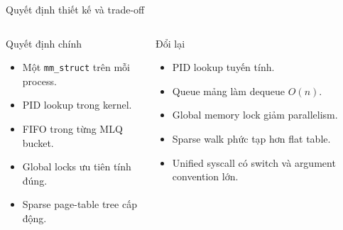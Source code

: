\documentclass[aspectratio=169,11pt]{beamer}
\newcommand{\code}[1]{\texttt{\color{bkblue}#1}}
\begin{document}
\begin{frame}{Quyết định thiết kế và trade-off}
  \begin{columns}[T,onlytextwidth]
      \begin{block}{Quyết định chính}
        \small
        \begin{itemize}
          \item Một \code{mm\_struct} trên mỗi process.
          \item PID lookup trong kernel.
          \item FIFO trong từng MLQ bucket.
          \item Global locks ưu tiên tính đúng.
          \item Sparse page-table tree cấp động.
        \end{itemize}
      \end{block}
      \begin{block}{Đổi lại}
        \small
        \begin{itemize}
          \item PID lookup tuyến tính.
          \item Queue mảng làm dequeue \(O(n)\).
          \item Global memory lock giảm parallelism.
          \item Sparse walk phức tạp hơn flat table.
          \item Unified syscall có switch và argument convention lớn.
        \end{itemize}
      \end{block}
  \end{columns}
\end{frame}
\end{document}
